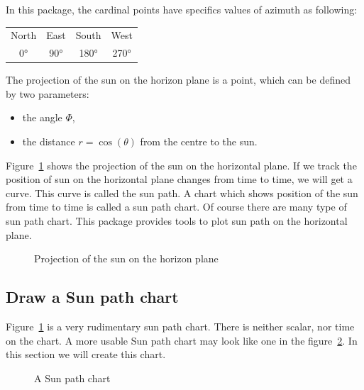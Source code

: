 In this package, the cardinal points have specifics values of azimuth as following:

\begin{tabular}{c c c c}
North & East & South & West \\
0°    & 90°  & 180°  & 270°
\end{tabular}


The projection of the sun on the horizon plane is a point, which can be defined by two parameters:
\begin{itemize}
\item the angle $\Phi$,
\item the distance $r = \cos(\theta)$ from the centre to the sun.
\end{itemize}

Figure~\ref{fig:sun-projection} shows the projection of the sun on the horizontal plane.
If we track the position of sun on the horizontal plane changes from time to time, we will get a curve.
This curve is called the sun path. 
A chart which shows position of the sun from time to time is called a sun path chart.
Of course there are many type of sun path chart. 
This package provides tools to plot sun path on the horizontal plane.

\begin{figure}[H]
\centering
{}
\caption{Projection of the sun on the horizon plane}
\label{fig:sun-projection}
\end{figure}


\subsection{Draw a Sun path chart}

Figure~\ref{fig:sun-projection} is a very rudimentary sun path chart.
There is neither scalar, nor time on the chart. 
A more usable Sun path chart may look like one in the figure~\ref{fig:full-sun-path-chart}.
In this section we will create this chart.


\begin{figure}[H]
\centering
{}
\caption{A Sun path chart}
\label{fig:full-sun-path-chart}
\end{figure}

